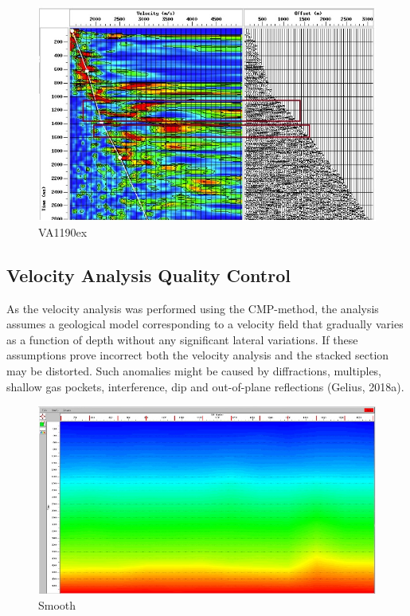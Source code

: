 \documentclass[10pt,a4paper]{article}
\begin{document}
\begin{figure}[H]
\includegraphics[width=\textwidth]{Velo_anal_example_1190.jpg}
\caption{VA1190ex}
\label{VA1190ex}
\end{figure}

\subsection{Velocity Analysis Quality Control}

As the velocity analysis was performed using the CMP-method, the analysis assumes a geological model corresponding to a velocity field that gradually varies as a function of depth without any significant lateral variations. If these assumptions prove incorrect both the velocity analysis and the stacked section may be distorted. Such anomalies might be caused by diffractions, multiples, shallow gas pockets, interference, dip and out-of-plane reflections (Gelius, 2018a). 

\begin{figure}[H]
\includegraphics[width=\textwidth]{Velo_anal_smooth.jpg}
\caption{Smooth}
\label{Smooth}
\end{figure}
\end{document}
